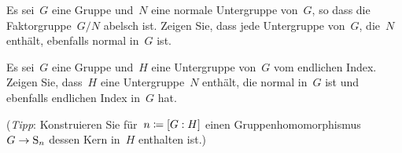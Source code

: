 \documentclass{scrartcl}
\begin{document}
\begin{exercise}
  Es sei~$G$ eine Gruppe und~$N$ eine normale Untergruppe von~$G$, so dass die Faktorgruppe~$G/N$ abelsch ist.
  Zeigen Sie, dass jede Untergruppe von~$G$, die~$N$ enthält, ebenfalls normal in~$G$ ist.
\end{exercise}

\begin{exercise}
  Es sei~$G$ eine Gruppe und~$H$ eine Untergruppe von~$G$ vom endlichen Index.
  Zeigen Sie, dass~$H$ eine Untergruppe~$N$ enthält, die normal in~$G$ ist und ebenfalls endlichen Index in~$G$ hat.

  (\emph{Tipp}: Konstruieren Sie für~$n \coloneqq [G : H]$ einen Gruppenhomomorphismus~$G \to \Sym_n$ dessen Kern in~$H$ enthalten ist.)
\end{exercise}

\end{document}
